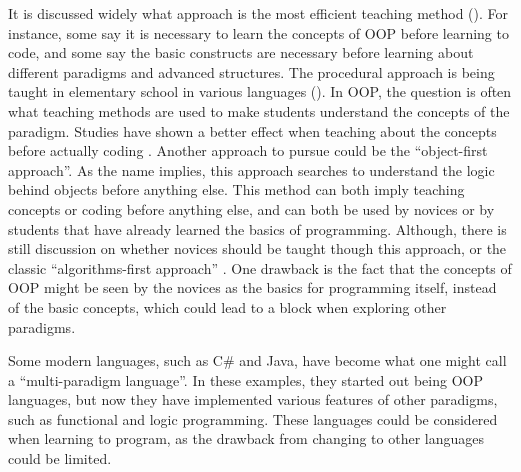
It is discussed widely what approach is the most efficient teaching method (). For instance, some say it is necessary to learn the concepts of OOP before learning to code, and some say the basic constructs are necessary before learning about different paradigms and advanced structures. The procedural approach is being taught in elementary school in various languages (). In OOP, the question is often what teaching methods are used to make students understand the concepts of the paradigm. Studies have shown a better effect when teaching about the concepts before actually coding \cite{Xinogalos15}. Another approach to pursue could be the ``object-first approach''. As the name implies, this approach searches to understand the logic behind objects before anything else. This method can both imply teaching concepts or coding before anything else, and can both be used by novices or by students that have already learned the basics of programming. Although, there is still discussion on whether novices should be taught though this approach, or the classic ``algorithms-first approach'' \cite{Periyamasy12}. One drawback is the fact that the concepts of OOP might be seen by the novices as the basics for programming itself, instead of the basic concepts, which could lead to a block when exploring other paradigms.

Some modern languages, such as C\# and Java, have become what one might call a ``multi-paradigm language''. In these examples, they started out being OOP languages, but now they have implemented various features of other paradigms, such as functional and logic programming. These languages could be considered when learning to program, as the drawback from changing to other languages could be limited.